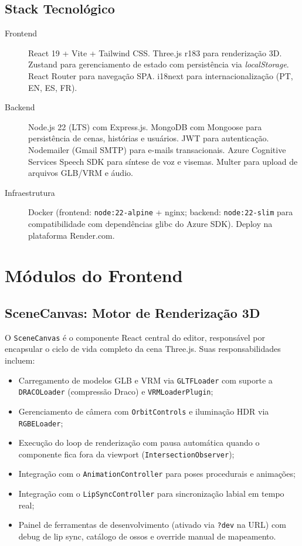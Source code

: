 \documentclass[
  12pt,
  openright,
  twoside,
  a4paper,
  english,
  brazil
]{abntex2}
\begin{document}
\subsection{Stack Tecnológico}
\label{subsec:stack}

\begin{description}
  \item[Frontend] React 19 + Vite + Tailwind CSS. Three.js r183 para
    renderização 3D. Zustand para gerenciamento de estado com persistência
    via \textit{localStorage}. React Router para navegação SPA.
    i18next para internacionalização (PT, EN, ES, FR).

  \item[Backend] Node.js 22 (LTS) com Express.js. MongoDB com Mongoose
    para persistência de cenas, histórias e usuários. JWT para
    autenticação. Nodemailer (Gmail SMTP) para e-mails transacionais.
    Azure Cognitive Services Speech SDK para síntese de voz e visemas.
    Multer para upload de arquivos GLB/VRM e áudio.

  \item[Infraestrutura] Docker (frontend: \texttt{node:22-alpine} +
    nginx; backend: \texttt{node:22-slim} para compatibilidade com
    dependências glibc do Azure SDK). Deploy na plataforma Render.com.
\end{description}

\section{Módulos do Frontend}
\label{sec:frontend}

\subsection{SceneCanvas: Motor de Renderização 3D}
\label{subsec:scenecanvas}

O \texttt{SceneCanvas} é o componente React central do editor, responsável
por encapsular o ciclo de vida completo da cena Three.js. Suas
responsabilidades incluem:

\begin{itemize}
  \item Carregamento de modelos GLB e VRM via \texttt{GLTFLoader} com
        suporte a \texttt{DRACOLoader} (compressão Draco) e
        \texttt{VRMLoaderPlugin};
  \item Gerenciamento de câmera com \texttt{OrbitControls} e iluminação
        HDR via \texttt{RGBELoader};
  \item Execução do loop de renderização com pausa automática quando o
        componente fica fora da viewport (\texttt{IntersectionObserver});
  \item Integração com o \texttt{AnimationController} para poses
        procedurais e animações;
  \item Integração com o \texttt{LipSyncController} para sincronização
        labial em tempo real;
  \item Painel de ferramentas de desenvolvimento (ativado via
        \texttt{?dev} na URL) com debug de lip sync, catálogo de ossos
        e override manual de mapeamento.
\end{itemize}
\end{document}
